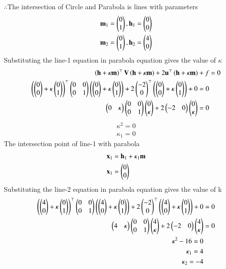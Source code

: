 \documentclass[journal]{IEEEtran}
\begin{document}
$\therefore $The intersection of Circle and Parabola is lines with parameters
\begin{align}
\vec{m}_1 = \myvec{0 \\ 1}, \vec{h}_1 = \myvec{0 \\ 0} \\
\vec{m}_2 = \myvec{0 \\ 1}, \vec{h}_2 = \myvec{4 \\ 0}
\end{align}
Substituting the line-1 equation in parabola equation gives the value of $\kappa$
\begin{align}
\brak{\vec{h}+\kappa\vec{m}}^\top\vec{V}\brak{\vec{h}+\kappa\vec{m}} + 2\vec{u}^\top\brak{\vec{h}+\kappa\vec{m}} + f &= 0 \\
\brak{\myvec{0 \\ 0} + \kappa \myvec{0\\1}}^\top \myvec{ 0&0\\0&1}\brak{\myvec{0 \\ 0}+ \kappa \myvec{0\\1}} + 2\myvec{-2\\0}^\top \brak{\myvec{0 \\ 0} + \kappa \myvec{0\\1}} + 0 = 0 \\
\myvec{0 & \kappa}\myvec{0 & 0 \\ 0 &1}\myvec{0 \\ \kappa} + 2\myvec{-2 & 0}\myvec{0 \\ \kappa} = 0
\end{align}
\begin{align}
    \kappa^2 = 0 \\
    \kappa_1 = 0
\end{align}
The intersection point of line-1 with parabola
\begin{align}
    \vec{x}_1 &= \vec{h}_1 + \kappa_1\vec{m}\\
    \vec{x}_1 &= \myvec{0 \\ 0}
\end{align}
Substituting the line-2 equation in parabola equation gives the value of k
\begin{align}
    \brak{\myvec{4\\0}+\kappa\myvec{0\\1}}^\top\myvec{0 & 0\\0 & 1}\brak{\myvec{4\\0}+\kappa\myvec{0\\1}} + 2\myvec{-2\\0}^\top\brak{\myvec{4\\0}+\kappa\myvec{0\\1}} + 0 &= 0\\
\myvec{4&\kappa}\myvec{0&0\\0&1}\myvec{4\\\kappa}+2\myvec{-2&0}\myvec{4\\\kappa} &= 0\\
\kappa^2 - 16 = 0 \\
\kappa_1 = 4 \\
\kappa_2 = -4
\end{align}
\end{document}
